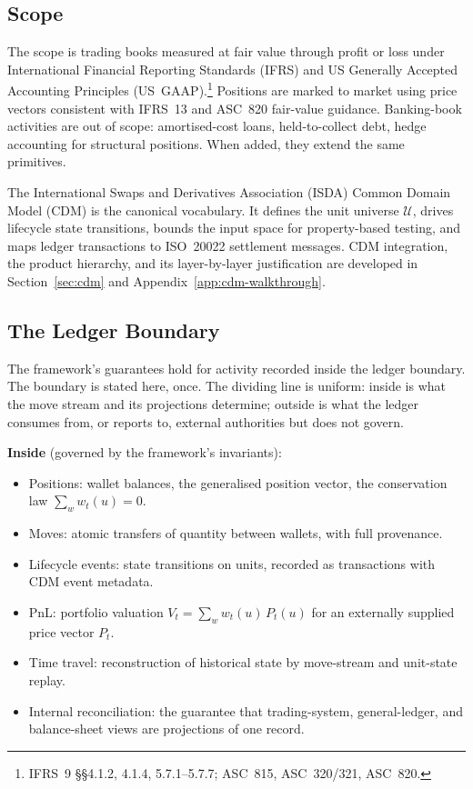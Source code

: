 \subsection{Scope}

The scope is trading books measured at fair value through profit or loss under International Financial Reporting Standards (IFRS) and US Generally Accepted Accounting Principles (US~GAAP).\footnote{IFRS~9 \S\S4.1.2, 4.1.4, 5.7.1--5.7.7; ASC~815, ASC~320/321, ASC~820.} Positions are marked to market using price vectors consistent with IFRS~13 and ASC~820 fair-value guidance. Banking-book activities are out of scope: amortised-cost loans, held-to-collect debt, hedge accounting for structural positions. When added, they extend the same primitives.

The International Swaps and Derivatives Association (ISDA) Common Domain Model (CDM) is the canonical vocabulary. It defines the unit universe $\mathcal{U}$, drives lifecycle state transitions, bounds the input space for property-based testing, and maps ledger transactions to ISO~20022 settlement messages. CDM integration, the product hierarchy, and its layer-by-layer justification are developed in Section~\ref{sec:cdm} and Appendix~\ref{app:cdm-walkthrough}.

\subsection{The Ledger Boundary}
\label{sec:scope-overview}

The framework's guarantees hold for activity recorded inside the ledger boundary. The boundary is stated here, once. The dividing line is uniform: inside is what the move stream and its projections determine; outside is what the ledger consumes from, or reports to, external authorities but does not govern.

\medskip
\noindent\textbf{Inside} (governed by the framework's invariants):
\begin{itemize}[nosep]
\item Positions: wallet balances, the generalised position vector, the conservation law $\sum_w w_t(u) = 0$.
\item Moves: atomic transfers of quantity between wallets, with full provenance.
\item Lifecycle events: state transitions on units, recorded as transactions with CDM event metadata.
\item PnL: portfolio valuation $V_t = \sum_w w_t(u)\,P_t(u)$ for an externally supplied price vector $P_t$.
\item Time travel: reconstruction of historical state by move-stream and unit-state replay.
\item Internal reconciliation: the guarantee that trading-system, general-ledger, and balance-sheet views are projections of one record.
\end{itemize}

